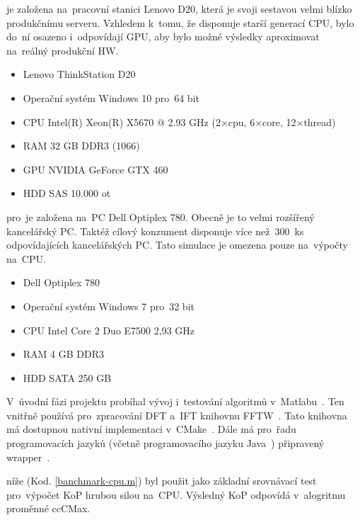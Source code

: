 

je založena na~pracovní stanici Lenovo D20, která je svoji sestavou velmi blízko produkčnímu serveru. Vzhledem k~tomu, že disponuje starší generací CPU, bylo do~ní osazeno i~odpovídají GPU, aby bylo možné výsledky aproximovat na~reálný produkční HW.
\begin{itemize}
	\setlength{\parskip}{0pt}
	\setlength{\itemsep}{0pt}
	\item {Lenovo ThinkStation D20}
	\item {Operační systém Windows 10 pro~64 bit}
    \item {CPU Intel(R) Xeon(R) X5670 @ 2.93 GHz (2×cpu, 6×core, 12×thread)}
    \item {RAM 32 GB DDR3 (1066)}
    \item {GPU NVIDIA GeForce GTX 460}
    \item {HDD SAS 10.000 ot}
\end{itemize}

pro~je založena na~PC Dell Optiplex 780. Obecně je to velmi rozšířený kancelářský PC. Taktéž cílový konzument disponuje více než~300~ks odpovídajících kancelářských PC. Tato simulace je omezena pouze na~výpočty na~CPU.
\begin{itemize}
	\setlength{\parskip}{0pt}
	\setlength{\itemsep}{0pt}
	\item {Dell Optiplex 780}
	\item {Operační systém Windows 7 pro~32 bit}
	\item {CPU Intel Core 2 Duo E7500 2,93 GHz}
	\item {RAM 4 GB DDR3}
	\item {HDD SATA 250 GB}
\end{itemize}

V~úvodní fázi projektu probíhal vývoj i~testování algoritmů v~Matlabu~\cite{matlab}. Ten vnitřně používá pro~zpracování DFT a~IFT knihovnu FFTW~\cite{fftw}. Tato knihovna má dostupnou nativní implementaci v~CMake~\cite{cmake}. Dále má pro~řadu programovacích jazyků (včetně programovacího jazyku Java~\cite{FFT-java}) připravený wrapper~\cite{wrapper}.

níže (Kod. \ref{banchmark-cpu.m}) byl použit jako základní srovnávací test pro~výpočet KoP hrubou silou na~CPU. Výsledný KoP odpovídá v~alogritmu proměnné ccCMax.

